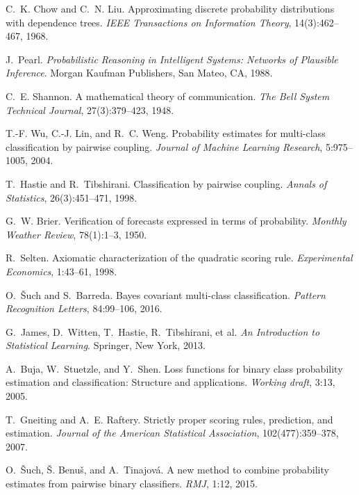 \documentclass[preprint,12pt]{elsarticle}
\theoremstyle{thmstyleone}%
\theoremstyle{thmstyletwo}%
\theoremstyle{thmstylethree}%
\begin{document}
\begin{thebibliography}{00}

C.~K. Chow and C.~N. Liu.
Approximating discrete probability distributions with dependence trees.
\emph{IEEE Transactions on Information Theory}, 14(3):462--467, 1968.

J.~Pearl.
\emph{Probabilistic Reasoning in Intelligent Systems: Networks of Plausible Inference}.
Morgan Kaufman Publishers, San Mateo, CA, 1988.

C.~E. Shannon.
A mathematical theory of communication.
\emph{The Bell System Technical Journal}, 27(3):379--423, 1948.

T.-F. Wu, C.-J. Lin, and R.~C. Weng.
Probability estimates for multi-class classification by pairwise coupling.
\emph{Journal of Machine Learning Research}, 5:975--1005, 2004.

T.~Hastie and R.~Tibshirani.
Classification by pairwise coupling.
\emph{Annals of Statistics}, 26(3):451--471, 1998.

G.~W. Brier.
Verification of forecasts expressed in terms of probability.
\emph{Monthly Weather Review}, 78(1):1--3, 1950.

R.~Selten.
Axiomatic characterization of the quadratic scoring rule.
\emph{Experimental Economics}, 1:43--61, 1998.

O.~{\v{S}}uch and S.~Barreda.
Bayes covariant multi-class classification.
\emph{Pattern Recognition Letters}, 84:99--106, 2016.

G.~James, D.~Witten, T.~Hastie, R.~Tibshirani, et al.
\emph{An Introduction to Statistical Learning}.
Springer, New York, 2013.

A.~Buja, W.~Stuetzle, and Y.~Shen.
Loss functions for binary class probability estimation and classification: Structure and applications.
\emph{Working draft}, 3:13, 2005.

T.~Gneiting and A.~E. Raftery.
Strictly proper scoring rules, prediction, and estimation.
\emph{Journal of the American Statistical Association}, 102(477):359--378, 2007.

O.~{\v{S}}uch, {\v{S}}. Benu{\v{s}}, and A.~Tinajov{\'a}.
A new method to combine probability estimates from pairwise binary classifiers.
\emph{RMJ}, 1:12, 2015.


\end{thebibliography}
\end{document}
